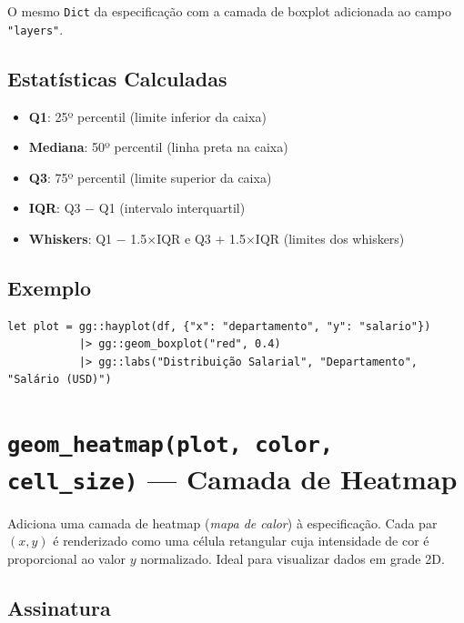 \documentclass[12pt, a4paper, oneside]{book}
\newcommand{\code}[1]{\texttt{#1}}
\begin{document}
O mesmo \code{Dict} da especificação com a camada de boxplot adicionada ao
campo \code{"layers"}.

\subsection*{Estatísticas Calculadas}

\begin{itemize}
  \item \textbf{Q1}: 25º percentil (limite inferior da caixa)
  \item \textbf{Mediana}: 50º percentil (linha preta na caixa)
  \item \textbf{Q3}: 75º percentil (limite superior da caixa)
  \item \textbf{IQR}: Q3 $-$ Q1 (intervalo interquartil)
  \item \textbf{Whiskers}: Q1 $-$ 1.5$\times$IQR e Q3 $+$ 1.5$\times$IQR (limites dos whiskers)
\end{itemize}

\subsection*{Exemplo}

\begin{lstlisting}[caption={Boxplot de distribuição salarial}]
let plot = gg::hayplot(df, {"x": "departamento", "y": "salario"})
           |> gg::geom_boxplot("red", 0.4)
           |> gg::labs("Distribuição Salarial", "Departamento", "Salário (USD)")
\end{lstlisting}

\section{\texttt{geom\_heatmap(plot, color, cell\_size)} --- Camada de Heatmap}

Adiciona uma camada de heatmap (\textit{mapa de calor}) à especificação.
Cada par $(x, y)$ é renderizado como uma célula retangular cuja intensidade de cor
é proporcional ao valor $y$ normalizado. Ideal para visualizar dados em grade 2D.

\subsection*{Assinatura}
\end{document}
